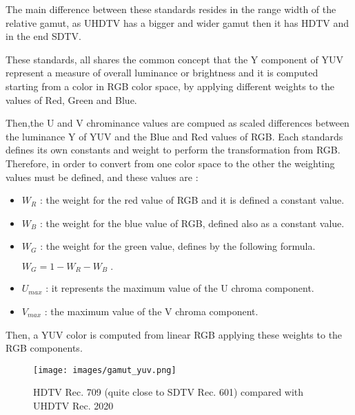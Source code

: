 \documentclass[12pt,a4paper]{extarticle}
\begin{document}
The main difference between these standards resides in the range width of the relative gamut, as UHDTV has a bigger and wider gamut then it has HDTV and in the end SDTV.

These standards, all shares the common concept that the Y component of YUV represent a measure of overall luminance or brightness and it is computed starting from a color in RGB color space, by applying different weights to the values of Red, Green and Blue.

Then,the U and V chrominance values are compued as scaled differences between the luminance Y of YUV and the Blue and Red values of RGB.
Each standards defines its own constants and weight to perform the transformation from RGB.
Therefore, in order to convert from one color space to the other the weighting values must be defined, and these values are :
\begin{itemize}
\item $W_{R}$ : the weight for the red value of RGB and it is defined a constant value.
\item $W_{B}$ : the weight for the blue value of RGB, defined also as a constant value.
\item $W_{G}$ : the weight for the green value, defines by the following formula.
\begin{center}
$W_{G}=1-W_{R}-W_{B} \;.$ 
\end{center}
\item $U_{max}$ : it represents the maximum value of the U chroma component.
\item $V_{max}$ : the maximum value of the V chroma component.
\end{itemize}
Then, a YUV color is computed from linear RGB %
applying these weights to the RGB components.

\begin{figure}[hbtp]
\centering
\texttt{[image: images/gamut\_yuv.png]}
\caption{HDTV Rec. 709 (quite close to SDTV Rec. 601) compared with UHDTV Rec. 2020 \cite{wiki_yuv}} 
\end{figure}
\end{document}

